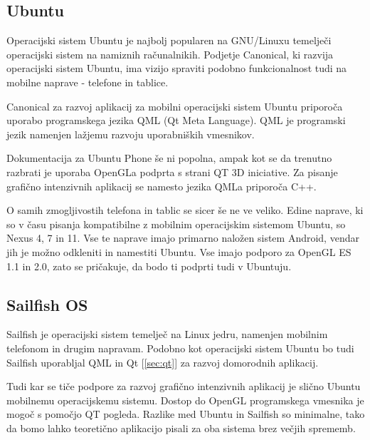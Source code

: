 \subsection{Ubuntu}

Operacijski sistem Ubuntu \cite{ubuntu} je najbolj popularen na GNU/Linuxu temelječi operacijski sistem na namiznih računalnikih. Podjetje Canonical, ki razvija operacijski sistem Ubuntu, ima vizijo spraviti podobno funkcionalnost tudi na mobilne naprave - telefone in tablice. %

Canonical za razvoj aplikacij za mobilni operacijski sistem Ubuntu priporoča uporabo programskega jezika QML (Qt Meta Language). QML je programski jezik namenjen lažjemu razvoju uporabniških vmesnikov. 

Dokumentacija za Ubuntu Phone še ni popolna, ampak kot se da trenutno razbrati je uporaba OpenGLa podprta s strani QT 3D iniciative. Za pisanje grafično intenzivnih aplikacij se namesto jezika QMLa priporoča C++.

O samih zmogljivostih telefona in tablic se sicer še ne ve veliko. Edine naprave, ki so v času pisanja kompatibilne z mobilnim operacijskim sistemom Ubuntu, so Nexus 4, 7 in 11. Vse te naprave imajo primarno naložen sistem Android, vendar jih je možno odkleniti in namestiti Ubuntu. Vse imajo podporo za OpenGL ES 1.1 in 2.0, zato se pričakuje, da bodo ti podprti tudi v Ubuntuju.

\subsection{Sailfish OS}

Sailfish \cite{sailfishos} je operacijski sistem temelječ na Linux jedru, namenjen mobilnim telefonom in drugim napravam. Podobno kot operacijski sistem Ubuntu bo tudi Sailfish uporabljal QML in Qt [\ref{sec:qt}] za razvoj domorodnih aplikacij.

Tudi kar se tiče podpore za razvoj grafično intenzivnih aplikacij je slično Ubuntu mobilnemu operacijskemu sistemu. Dostop do OpenGL programskega vmesnika je mogoč s pomočjo QT pogleda. Razlike med Ubuntu in Sailfish so minimalne, tako da bomo lahko teoretično aplikacijo pisali za oba sistema brez večjih sprememb.

